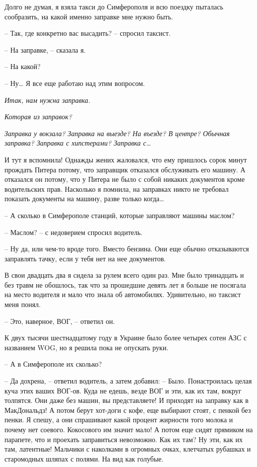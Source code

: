 \documentclass[
]{book}
\begin{document}
Долго не думая, я взяла такси до Симферополя и всю поездку пыталась сообразить, на какой именно заправке мне нужно быть.

-- Так, где конкретно вас высадить? -- спросил таксист.

-- На заправке, -- сказала я.

-- На какой?

-- Ну\ldots{} Я все еще работаю над этим вопросом.

\emph{Итак, нам нужна заправка.}

\emph{Которая из заправок?}

\emph{Заправка у вокзала? Заправка на выезде? На въезде? В центре? Обычная заправка? Заправка с хипстерами? Заправка с\ldots{}}

И тут я вспомнила! Однажды жених жаловался, что ему пришлось сорок минут прождать Питера потому, что заправщик отказался обслуживать его машину. А отказался он потому, что у Питера не было с собой никаких документов кроме водительских прав. Насколько я помнила, на заправках никто не требовал показать документы на машину, разве только когда\ldots{}

-- А сколько в Симферополе станций, которые заправляют машины маслом?

-- Маслом? -- с недоверием спросил водитель.

-- Ну да, или чем-то вроде того. Вместо бензина. Они еще обычно отказываются заправлять тачку, если у тебя нет на нее документов.

В свои двадцать два я сидела за рулем всего один раз. Мне было тринадцать и без травм не обошлось, так что за прошедшие девять лет я больше не посягала на место водителя и мало что знала об автомобилях. Удивительно, но таксист меня понял.

-- Это, наверное, ВОГ, -- ответил он.

К двух тысячи шестнадцатому году в Украине было более четырех сотен АЗС с названием WOG, но я решила пока не опускать руки.

-- А в Симферополе их сколько?

-- Да дохрена, -- ответил водитель, а затем добавил: -- Было. Понастроилась целая куча этих ваших ВОГ-ов. Куда не едешь, везде ВОГ и эти, как их там, вокруг толпятся. Они даже без машин, вы представляете! И приходят на заправку как в МакДональдз! А потом берут хот-доги с кофе, еще выбирают стоят, с пенкой без пенки. Я спешу, а они спрашивают какой процент жирности того молока и почему нет соевого. Кокосового им значит мало! А потом еще сидят прямиком на парапете, что и проехать заправиться невозможно. Как их там? Ну эти, как их там, латентные! Мальчики с наколками в огромных очках, клетчатых рубашках и старомодных шляпах с полями. На вид как голубые.
\end{document}
